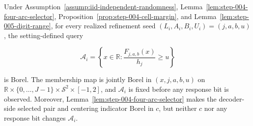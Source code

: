 \begin{proposition}\label{prop:step-005-query-precommitment}
Under Assumption~\ref{assump:iid-independent-randomness}, Lemma~\ref{lem:step-004-four-arc-selector}, Proposition~\ref{prop:step-004-cell-margin}, and Lemma~\ref{lem:step-005-digit-range}, for every realized refinement seed \((L_i,A_i,B_i,U_i)=(j,a,b,u)\), the setting-defined query

\[
\mathcal A_i=\left\{x\in\mathbb R:
\frac{F_{j,a,b}(x)}{h_j}\geq u\right\}
\]

is Borel. The membership map is jointly Borel in \((x,j,a,b,u)\) on
\(\mathbb R\times\{0,\ldots,J-1\}\times\mathcal S^2\times[-1,2]\), and \(\mathcal A_i\) is fixed before any response bit is observed. Moreover, Lemma~\ref{lem:step-004-four-arc-selector} makes the decoder-side selected pair and centering indicator Borel in \(c\), but neither \(c\) nor any response bit changes \(\mathcal A_i\).
\end{proposition}

